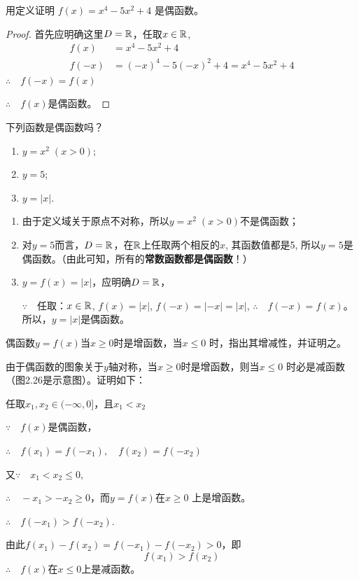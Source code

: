 \begin{example}
    用定义证明
$f(x)=x^4-5x^2+4$
是偶函数。
\end{example}

\begin{proof}
    首先应明确这里$D=\mathbb{R}$，任取$x\in\mathbb{R}$,
\[\begin{split}
    f(x)&=x^4-5x^2+4\\
    f(-x)&=(-x)^4-5(-x)^2+4=x^4-5x^2+4
\end{split}\]
$\therefore\quad f(-x)=f(x)$

$\therefore\quad f(x)$是偶函数。
\end{proof}

\begin{example}
    下列函数是偶函数吗？
\begin{multicols}{3}
\begin{enumerate}[(1)]
    \item $y=x^2\; (x>0)$;
    \item $y=5$;
    \item $y=|x|$.
\end{enumerate}
\end{multicols}
\end{example}

\begin{analyze}
\begin{enumerate}
    \item 由于定义域关于原点不对称，所以$y=x^2\; (x>0)$不是偶函数；
    \item 对$y=5$而言，$D=\mathbb{R}$，在$\mathbb{R}$上任取两个相反的$x$, 其函数值都是5, 所以$y=5$是偶函数。（由此可知，所有的\textbf{常数函数都是偶函数}！）
    \item $y=f(x)=|x|$，应明确$D=\mathbb{R}$，
    
    $\because\quad $任取：$x\in\mathbb{R}$, $f(x)=|x|$, $f(-x)=|-x|=|x|$,
    $\therefore\quad f(-x)=f(x)$。所以，$y=|x|$是偶函数。
\end{enumerate}
\end{analyze}

\begin{example}
    偶函数$y=f(x)$当$x\ge 0$时是增函数，当$x\le 0$
时，指出其增减性，并证明之。
\end{example}

\begin{solution}
    由于偶函数的图象关于$y$轴对称，当$x\ge 0$时是增函数，则当$x\le 0$
时必是减函数（图2.26是示意图）。证明如下：

任取$x_1,x_2\in(-\infty,0]$，且$x_1<x_2$

$\because\quad f(x)$是偶函数，

$\therefore\quad f(x_1)=f(-x_1),\quad f(x_2)=f(-x_2)$

又$\because\quad x_1<x_2\le 0$,

$\therefore\quad -x_1>-x_2\ge 0$，而$y=f(x)$在$x\ge 0$
上是增函数。

$\therefore\quad f(-x_1)>f(-x_2)$.

由此$f(x_1)-f(x_2)=f(-x_1)-f(-x_2)>0$，即
\[f(x_1)>f(x_2)\]
$\therefore\quad f(x)$在$x\le 0$上是减函数。
\end{solution}

